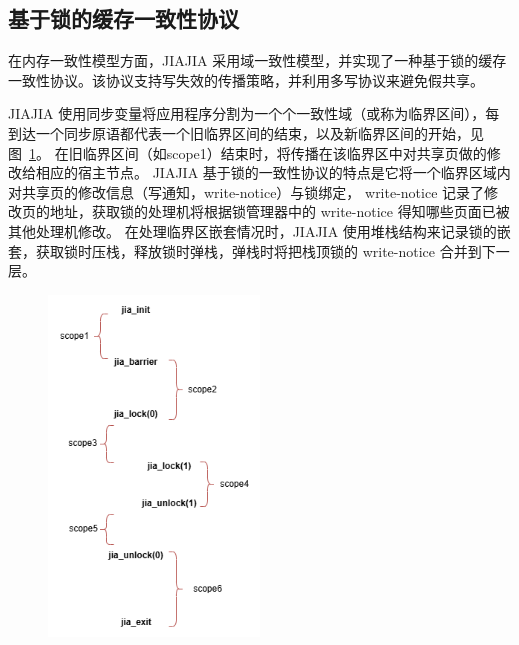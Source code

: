 {    \subsection{基于锁的缓存一致性协议}
    在内存一致性模型方面，JIAJIA 采用域一致性模型，并实现了一种基于锁的缓存一致性协议。该协议支持写失效的传播策略，并利用多写协议来避免假共享。

    JIAJIA 使用同步变量将应用程序分割为一个个一致性域（或称为临界区间），每到达一个同步原语都代表一个旧临界区间的结束，以及新临界区间的开始，见图~\ref{fig:JIAJIA-scopes}。
    在旧临界区间（如scope1）结束时，将传播在该临界区中对共享页做的修改给相应的宿主节点。
    JIAJIA 基于锁的一致性协议的特点是它将一个临界区域内对共享页的修改信息（写通知，write-notice）与锁绑定，
    write-notice 记录了修改页的地址，获取锁的处理机将根据锁管理器中的 write-notice 得知哪些页面已被其他处理机修改。
    在处理临界区嵌套情况时，JIAJIA 使用堆栈结构来记录锁的嵌套，获取锁时压栈，释放锁时弹栈，弹栈时将把栈顶锁的 write-notice 合并到下一层。

    \begin{figure}[!htbp]
        \centering
        \includegraphics[width=0.50\textwidth]{Img/JIAJIA-scope.png}
        \label{fig:JIAJIA-scopes}
    \end{figure}

}
